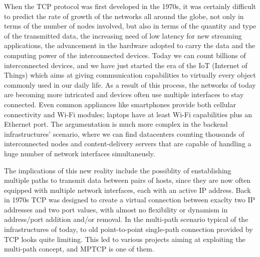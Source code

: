 \vspace{5mm}
When the TCP protocol was first developed in the 1970s, it was certainly difficult to predict the rate of growth of the networks all around the globe, not only in terms of the number of nodes involved, but also in terms of the quantity and type of the transmitted data, the increasing need of low latency for new streaming applications, the advancement in the hardware adopted to carry the data and the computing power of the interconnected devices. Today we can count billions of interconnected devices, and we have just started the era of the IoT (Internet of Things) which aims at giving communication capabilities to virtually every object commonly used in our daily life.
As a result of this process, the networks of today are becoming more intricated and devices often use multiple interfaces to stay connected. Even common appliances like smartphones provide both cellular connectivity and Wi-Fi modules; laptops have at least Wi-Fi capabilities plus an Ethernet port. The argumentation is much more complex in the backend infrastructures' scenario, where we can find datacenters counting thousands of interconnected nodes and content-delivery servers that are capable of handling a huge number of network interfaces simultaneusly.


The implications of this new reality include the possiblity of enstablishing multiple paths to transmit data between pairs of hosts, since they are now often equipped with multiple network interfaces, each with an active IP address. Back in 1970s TCP was designed to create a virtual connection between exaclty two IP addresses and two port values, with almost no flexibility or dynamism in address/port addition and/or removal. In the multi-path scenario typical of the infrastructures of today, to old point-to-point single-path connection provided by TCP looks quite limiting. This led to various projects aiming at exploiting the multi-path concept, and MPTCP is one of them.

